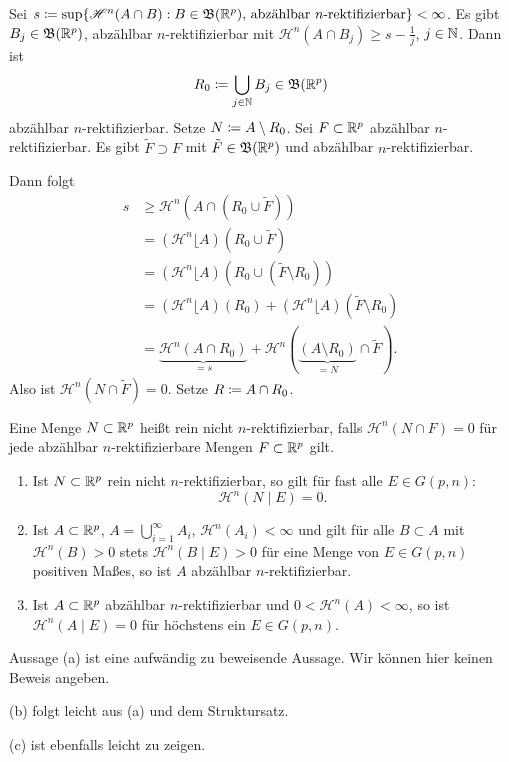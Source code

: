 \documentclass[a4paper,twoside,DIV15,BCOR12mm]{scrbook}
\newcommand{\borel}{\mathfrak B}
\newcommand{\HM}{\mathscr H}
\newcommand{\MR}{\lfloor}
\begin{document}
\begin{beweis}
Sei $s\da \sup\{\HM^n(A\cap B): B\in\borel(\MdR^p)\text{, abzählbar $n$-rektifizierbar}\} < \infty$. Es gibt $B_j\in \borel(\MdR^p)$, abzählbar $n$-rektifizierbar mit $\HM^n(A\cap B_j) \ge s-\frac1j$, $j\in \mathbb{N}$. 
Dann ist
\[
R_0 \da \bigcup_{j\in\MdN} B_j \in \borel (\MdR^p)
\]
abzählbar $n$-rektifizierbar. Setze $N\da A\setminus R_0$. Sei $F\subset \mathbb{R}^p$ abzählbar $n$-rektifizierbar. Es gibt $\tilde F \supset F$ mit $\tilde F\in \borel(\MdR^p)$ und abzählbar $n$-rektifizierbar.

Dann folgt
\begin{align*}
s &\ge \HM^n(A\cap (R_0\cup \tilde F)) \\
&=(\HM^n\MR A) (R_0\cup \tilde F) \\
&=(\HM^n\MR A) (R_0\cup (\tilde F\setminus R_0)) \\
&=(\HM^n\MR A) (R_0) + (\HM^n \MR A) (\tilde F\setminus R_0) \\
&=\underbrace{\HM^n(A\cap R_0)}_{=s} + \HM^n( \underbrace{(A\setminus R_0)}_{=N} \mathop{\cap} \tilde F).
\end{align*}
Also ist $\HM^n(N\cap \tilde F)= 0$. Setze $R\da A\cap R_0$.
\end{beweis}

\begin{definition}
Eine Menge $N\subset \mathbb{R}^p$ heißt rein nicht $n$-rektifizierbar, falls $\HM^n(N\cap F)=0$ für jede abzählbar  $n$-rektifizierbare Mengen $F\subset \mathbb{R}^p$ gilt.
\end{definition}

\begin{satz}[Charakterisierungssatz]
\begin{enumerate}[\quad(a)]
\item Ist $N\subset \mathbb{R}^p$ rein nicht $n$-rektifizierbar, so gilt für fast alle $E\in G(p,n)$:
\[
\HM^n(N\mid E) = 0.
\]
\item  Ist $A\subset \mathbb{R}^p$, $A= \bigcup_{i=1}^\infty A_i$, $\HM^n(A_i)<\infty$ und gilt für alle $B\subset A$ mit $\HM^n(B)>0$ stets $\HM^n(B\mid E) > 0$ für eine Menge von $E\in G(p,n)$ positiven Maßes, so ist $A$ abzählbar $n$-rektifizierbar.
\item Ist $A\subset \mathbb{R}^p$ abzählbar $n$-rektifizierbar und $0< \HM^n(A) < \infty$, so ist $\HM^n(A\mid E) = 0$ für höchstens ein $E\in G(p,n)$.
\end{enumerate}
\end{satz}
\begin{beweis}
Aussage (a) ist eine aufwändig zu beweisende Aussage. Wir können hier keinen Beweis angeben. 

(b) folgt leicht aus (a) und dem Struktursatz. 

(c) ist ebenfalls leicht zu zeigen.
\end{beweis}
\end{document}
